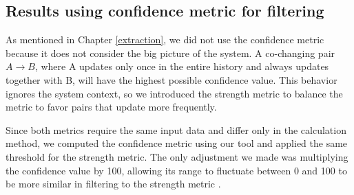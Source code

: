\subsection{Results using confidence metric for filtering}
\label{sec:measure_metrics}

\hspace{4em}As mentioned in Chapter \ref{extraction}, we did not use the confidence metric because it does not consider the big picture of the system. A co-changing pair $A \rightarrow B$, where A updates only once in the entire history and always updates together with B, will have the highest possible confidence value. This behavior ignores the system context, so we introduced the strength metric to balance the metric to favor pairs that update more frequently.

Since both metrics require the same input data and differ only in the calculation method, we computed the confidence metric using our tool and applied the same threshold for the strength metric. The only adjustment we made was multiplying the confidence value by 100, allowing its range to fluctuate between 0 and 100 to be more similar in filtering to the strength metric \cite{b4}.

\begin{table}[!h]
\setlength\tabcolsep{3.5pt}
\caption{ Average results obtained with strength versus confidence metric.}
\label{tab:confidence_vs_strength}
\centering
{}
\end{table}

